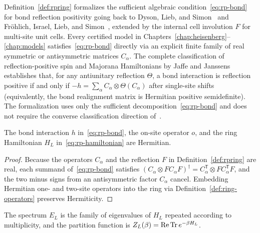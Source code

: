 \begin{remark}
  \label{rem:jaffe-janssens}
  Definition~\ref{def:rpring} formalizes the sufficient algebraic condition~\eqref{eq:rp-bond} for
  bond reflection positivity going back to Dyson, Lieb, and Simon~\cite{Dyson1978Phase} and
  Fr\"ohlich, Israel, Lieb, and Simon~\cite{Frohlich1978Phase}, extended by the internal cell
  involution \(F\) for multi-site unit cells. Every certified model in
  Chapters~\ref{chap:heisenberg}--\ref{chap:models} satisfies~\eqref{eq:rp-bond} directly via an
  explicit finite family of real symmetric or antisymmetric matrices \(C_\alpha\). The complete
  classification of reflection-positive spin and Majorana Hamiltonians by Jaffe and
  Janssens~\cite{Jaffe2016Characterization} establishes that, for any antiunitary reflection
  \(\Theta\), a bond interaction is reflection positive if and only if \(-h = \sum_\alpha C_\alpha
  \otimes \Theta(C_\alpha)\) after single-site shifts (equivalently, the bond realignment matrix is
  Hermitian positive semidefinite). The formalization uses
  only the sufficient decomposition~\eqref{eq:rp-bond} and does not require the converse
  classification direction of~\cite{Jaffe2016Characterization}.
\end{remark}

\begin{lemma}
  \label{lem:rpring-hermitian}
  \leanok
  The bond interaction \(h\) in~\eqref{eq:rp-bond}, the on-site operator \(o\), and the ring
  Hamiltonian \(H_L\) in~\eqref{eq:rp-hamiltonian} are Hermitian.
\end{lemma}
\begin{proof}
  \leanok
  Because the operators \(C_\alpha\) and the reflection \(F\) in Definition~\ref{def:rpring} are
  real, each summand of~\eqref{eq:rp-bond} satisfies
  \((C_\alpha \otimes F C_\alpha F)^\dagger = C_\alpha^{\mathsf T} \otimes F C_\alpha^{\mathsf T}
  F\),
  and the two minus signs from an antisymmetric factor \(C_\alpha\) cancel. Embedding Hermitian
  one- and two-site operators into the ring via Definition~\ref{def:ring-operators} preserves
  Hermiticity.
\end{proof}

\begin{definition}
  \label{def:ring-spectrum}
  \leanok
  The spectrum \(E_L\) is the family of eigenvalues of \(H_L\) repeated according to multiplicity,
  and the partition function is \(Z_L(\beta) = \operatorname{Re}\operatorname{Tr} e^{-\beta H_L}\).
\end{definition}

